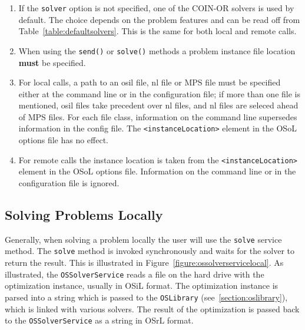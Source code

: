 \documentclass[11pt]{article}
\newcounter{Fig}
\renewcommand{\_}{{\char"5F}}
\renewcommand{\{}{{\char"7B}}
\renewcommand{\}}{{\char"7D}}
\renewcommand{\^}{{\char"0D}}
\renewcommand{\'}{{\char"0D}}
\begin{document}
\begin{enumerate}[Step 1:]
\begin{enumerate}
\item{}  If the {\tt solver} option is not specified, one of the COIN-OR solvers is used by default.
The choice depends on the problem features and can be read off from Table~\ref{table:defaultsolvers}.%
 This is the same for both local and remote calls.

\item{}  When using the {\tt send()} or  {\tt solve()} methods
a problem instance file location {\bf must} be specified.

\item{} For local calls, a path to an osil file, nl file or MPS file must be specified 
either at  the command line or in the configuration file; if more than one file is mentioned, osil files take 
precedent over nl files, and nl files are seleced ahead of MPS files. For each file class, information on the
command line supersedes information in the config file. 
The {\tt <instanceLocation>} element in the OSoL options file has no effect.

\item{} For remote calls the instance location is taken from the
{\tt <instanceLocation>} element in the OSoL options file.
Information on the command line or in the configuration file is ignored.


\end{enumerate}



\subsection{Solving Problems Locally}

Generally, when solving a problem locally the user will use the {\tt solve} service method.
The {\tt solve} method is invoked synchronously and waits for the solver to return the result.  This is illustrated
in Figure~\ref{figure:ossolverservicelocal}. As illustrated, the {\tt OSSolverService} reads a file on the hard drive
with the optimization instance, usually in OSiL format. The optimization instance is parsed into a string
which is passed to the {\tt OSLibrary} (see~\ref{section:oslibrary}),
which is linked with various solvers.
The result of the optimization is passed back to the {\tt OSSolverService} as a string in OSrL format.




\end{enumerate}
\end{document}
